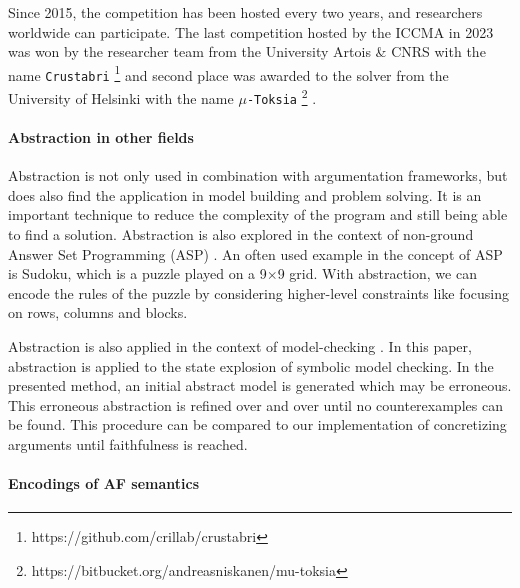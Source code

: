 Since 2015, the competition has been hosted every two years, and researchers worldwide can participate. The last competition hosted by the ICCMA in 2023 was won by the researcher team from the University Artois \& CNRS with the name \texttt{Crustabri} \footnote{https://github.com/crillab/crustabri} and second place was awarded to the solver from the University of Helsinki with the name \texttt{$\mu$-Toksia} \footnote{https://bitbucket.org/andreasniskanen/mu-toksia} \cite{DBLP:conf/kr/NiskanenJ20a}.


\paragraph{Abstraction in other fields} Abstraction is not only used in combination with argumentation frameworks, but does also find the application in model building and problem solving. It is an important technique to reduce the complexity of the program and still being able to find a solution. Abstraction is also explored in the context of non-ground Answer Set Programming (ASP) \cite{inproceedings:AbstractionInOtherDomains}. An often used example in the concept of ASP is Sudoku, which is a puzzle played on a 9$\times$9 grid. With abstraction, we can encode the rules of the puzzle by considering higher-level constraints like focusing on rows, columns and blocks.

Abstraction is also applied in the context of model-checking \cite{10.1145/876638.876643}. In this paper, abstraction is applied to the state explosion of symbolic model checking. In the presented method, an initial abstract model is generated which may be erroneous. This erroneous abstraction is refined over and over until no counterexamples can be found. This procedure can be compared to our implementation of concretizing arguments until faithfulness is reached.

\paragraph{Encodings of AF semantics} 




